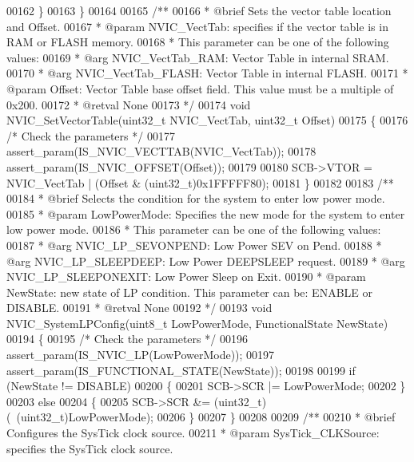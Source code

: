 \begin{DoxyCode}
00162   \}
00163 \}
00164 
00165 \textcolor{comment}{/**}
00166 \textcolor{comment}{  * @brief  Sets the vector table location and Offset.}
00167 \textcolor{comment}{  * @param  NVIC\_VectTab: specifies if the vector table is in RAM or FLASH memory.}
00168 \textcolor{comment}{  *   This parameter can be one of the following values:}
00169 \textcolor{comment}{  *     @arg NVIC\_VectTab\_RAM: Vector Table in internal SRAM.}
00170 \textcolor{comment}{  *     @arg NVIC\_VectTab\_FLASH: Vector Table in internal FLASH.}
00171 \textcolor{comment}{  * @param  Offset: Vector Table base offset field. This value must be a multiple of 0x200.}
00172 \textcolor{comment}{  * @retval None}
00173 \textcolor{comment}{  */}
00174 \textcolor{keywordtype}{void} NVIC_SetVectorTable(uint32\_t NVIC\_VectTab, uint32\_t Offset)
00175 \{
00176   \textcolor{comment}{/* Check the parameters */}
00177   assert_param(IS\_NVIC\_VECTTAB(NVIC\_VectTab));
00178   assert_param(IS\_NVIC\_OFFSET(Offset));
00179 
00180   SCB->VTOR = NVIC\_VectTab | (Offset & (uint32\_t)0x1FFFFF80);
00181 \}
00182 
00183 \textcolor{comment}{/**}
00184 \textcolor{comment}{  * @brief  Selects the condition for the system to enter low power mode.}
00185 \textcolor{comment}{  * @param  LowPowerMode: Specifies the new mode for the system to enter low power mode.}
00186 \textcolor{comment}{  *   This parameter can be one of the following values:}
00187 \textcolor{comment}{  *     @arg NVIC\_LP\_SEVONPEND: Low Power SEV on Pend.}
00188 \textcolor{comment}{  *     @arg NVIC\_LP\_SLEEPDEEP: Low Power DEEPSLEEP request.}
00189 \textcolor{comment}{  *     @arg NVIC\_LP\_SLEEPONEXIT: Low Power Sleep on Exit.}
00190 \textcolor{comment}{  * @param  NewState: new state of LP condition. This parameter can be: ENABLE or DISABLE.}
00191 \textcolor{comment}{  * @retval None}
00192 \textcolor{comment}{  */}
00193 \textcolor{keywordtype}{void} NVIC_SystemLPConfig(uint8\_t LowPowerMode, FunctionalState NewState)
00194 \{
00195   \textcolor{comment}{/* Check the parameters */}
00196   assert_param(IS\_NVIC\_LP(LowPowerMode));
00197   assert_param(IS\_FUNCTIONAL\_STATE(NewState));
00198 
00199   \textcolor{keywordflow}{if} (NewState != DISABLE)
00200   \{
00201     SCB->SCR |= LowPowerMode;
00202   \}
00203   \textcolor{keywordflow}{else}
00204   \{
00205     SCB->SCR &= (uint32\_t)(~(uint32\_t)LowPowerMode);
00206   \}
00207 \}
00208 
00209 \textcolor{comment}{/**}
00210 \textcolor{comment}{  * @brief  Configures the SysTick clock source.}
00211 \textcolor{comment}{  * @param  SysTick\_CLKSource: specifies the SysTick clock source.}

\end{DoxyCode}
